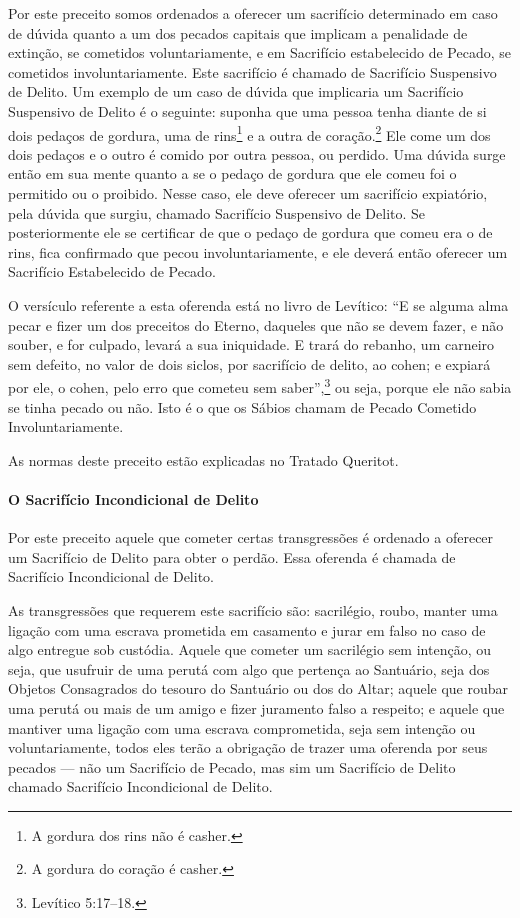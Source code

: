 \begin{multicols}{2}
Por este preceito somos ordenados a oferecer um sacrifício determinado
em caso de dúvida quanto a um dos pecados capitais que implicam a
penalidade de extinção, se cometidos voluntariamente, e em Sacrifício
estabelecido de Pecado, se cometidos involuntariamente. Este sacrifício
é chamado
de Sacrifício Suspensivo de Delito. Um exemplo de um caso de dúvida que
implicaria um Sacrifício Suspensivo de Delito é o seguinte: suponha que
uma
pessoa tenha diante de si dois pedaços de gordura, uma de rins\footnote{A gordura dos rins não é casher\starr.}
e a outra de coração.\footnote{A gordura do coração é casher\starr.} Ele come um dos dois pedaços
e o outro é comido por outra pessoa, ou perdido. Uma dúvida surge então
em sua mente quanto a se o pedaço de gordura que ele comeu foi o
permitido ou o proibido. Nesse caso, ele deve oferecer um sacrifício
expiatório, pela dúvida que surgiu, chamado Sacrifício Suspensivo de
Delito. Se posteriormente ele se certificar de que o pedaço de gordura
que comeu era o de rins, fica confirmado que pecou involuntariamente, e
ele deverá então oferecer um Sacrifício Estabelecido de Pecado.

O versículo referente a esta oferenda está no livro de Levítico: ``E se
alguma alma pecar e fizer um dos preceitos do Eterno, daqueles que não
se devem fazer, e não souber, e for culpado, levará a sua iniquidade. E
trará do rebanho, um carneiro sem defeito, no valor de dois siclos, por
sacrifício de delito, ao cohen\starr{}; e expiará por ele, o cohen\starr{}, pelo
erro que cometeu sem saber'',\footnote{Levítico 5:17--18.} ou seja, porque ele
não sabia se tinha pecado ou não. Isto é o que os Sábios chamam de
Pecado Cometido Involuntariamente.

As normas deste preceito estão explicadas no Tratado Queritot\starr.

\paragraph{O Sacrifício Incondicional de Delito}

Por este preceito aquele que cometer certas transgressões é ordenado a
oferecer um Sacrifício de Delito para obter o perdão. Essa oferenda é
chamada de Sacrifício Incondicional de Delito.

As transgressões que requerem este sacrifício são: sacrilégio, roubo,
manter uma ligação com uma escrava prometida em casamento e jurar em
falso no caso de algo entregue sob custódia. Aquele que cometer um
sacrilégio sem intenção, ou seja, que usufruir de uma perutá\starr{} com
algo que pertença ao Santuário, seja dos Objetos Consagrados do tesouro
do Santuário ou dos do Altar; aquele que roubar uma perutá\starr{} ou mais
de um amigo e fizer juramento falso a respeito; e aquele que mantiver
uma ligação com uma escrava comprometida, seja sem intenção ou
voluntariamente, todos eles terão a obrigação de trazer uma oferenda por seus pecados --- não um Sacrifício de Pecado, mas
sim um Sacrifício de Delito chamado Sacrifício Incondicional de Delito.


\end{multicols}
